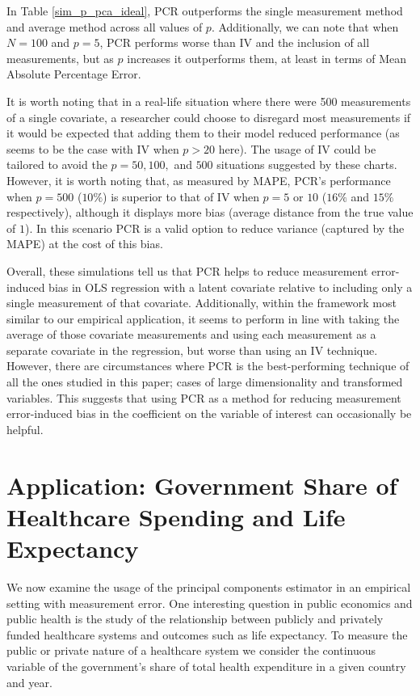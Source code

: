 \documentclass[10pt]{article}
\begin{document}
        In Table \ref{sim_p_pca_ideal}, PCR outperforms the single measurement method and average method across all values of $p$. Additionally, we can note that when $N=100$ and $p=5$, PCR performs worse than IV and the inclusion of all measurements, but as $p$ increases it outperforms them, at least in terms of Mean Absolute Percentage Error. 

        It is worth noting that in a real-life situation where there were 500 measurements of a single covariate, a researcher could choose to disregard most measurements if it would be expected that adding them to their model reduced performance (as seems to be the case with IV when $p>20$ here). The usage of IV could be tailored to avoid the $p=50,100,$ and $500$ situations suggested by these charts. However, it is worth noting that, as measured by MAPE, PCR's performance when $p=500$ ($10\%$) is superior to that of IV when $p=5$ or $10$ ($16\%$ and $15\%$ respectively), although it displays more bias (average distance from the true value of $1$). In this scenario PCR is a valid option to reduce variance (captured by the MAPE) at the cost of this bias.

        Overall, these simulations tell us that PCR helps to reduce measurement error-induced bias in OLS regression with a latent covariate relative to including only a single measurement of that covariate. Additionally, within the framework most similar to our empirical application, it seems to perform in line with taking the average of those covariate measurements and using each measurement as a separate covariate in the regression, but worse than using an IV technique. However, there are circumstances where PCR is the best-performing technique of all the ones studied in this paper; cases of large dimensionality and transformed variables. This suggests that using PCR as a method for reducing measurement error-induced bias in the coefficient on the variable of interest can occasionally be helpful.

    \section*{Application: Government Share of Healthcare Spending and Life Expectancy}

        We now examine the usage of the principal components estimator in an empirical setting with measurement error. One interesting question in public economics and public health is the study of the relationship between publicly and privately funded healthcare systems and outcomes such as life expectancy. To measure the public or private nature of a healthcare system we consider the continuous variable of the government's share of total health expenditure in a given country and year.
\end{document}
